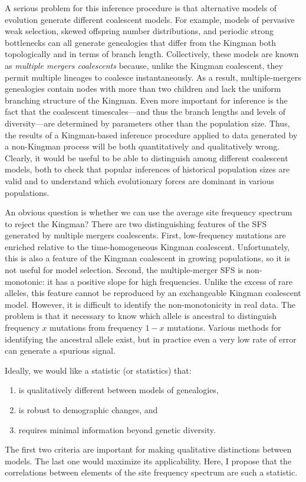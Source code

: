 \documentclass[11pt, letterpaper]{article}   	%
\begin{document}
A serious problem for this inference procedure is that alternative models of evolution generate different coalescent models. For example, models of pervasive weak selection, skewed offspring number distributions, and periodic strong bottlenecks can all generate genealogies that differ from the Kingman both topologically and in terms of branch length.
Collectively, these models are known as \emph{multiple mergers coalescents} because, unlike the Kingman coalescent, they permit multiple lineages to coalesce instantaneously. As a result, multiple-mergers genealogies contain nodes with more than two children and lack the uniform branching structure of the Kingman. Even more important for inference is the fact that the coalescent timescales---and thus the branch lengths and levels of diversity---are determined by parameters other than the population size.
Thus, the results of a Kingman-based inference procedure applied to data generated by a non-Kingman process will be both quantitatively and qualitatively wrong.
Clearly, it would be useful to be able to distinguish among different coalescent models, both to check that popular inferences of historical population sizes are valid and to understand which evolutionary forces are dominant in various populations.

An obvious question is whether we can use the average site frequency spectrum to reject the Kingman? There are two distinguishing features of the SFS generated by multiple mergers coalescents. First, low-frequency mutations are enriched relative to the time-homogeneous Kingman coalescent. Unfortunately, this is also a feature of the Kingman coalescent in growing populations, so it is not useful for model selection. Second, the multiple-merger SFS is non-monotonic: it has a positive slope for high frequencies. Unlike the excess of rare alleles, this feature cannot be reproduced by an exchangeable Kingman coalescent model. However, it is difficult to identify the non-monotonicity in real data. The problem is that it necessary to know which allele is ancestral to distinguish frequency $x$ mutations from frequency $1-x$ mutations. Various methods for identifying the ancestral allele exist, but in practice even a very low rate of error can generate a spurious signal.

Ideally, we would like a statistic (or statistics) that:
\begin{enumerate}
\item is qualitatively different between models of genealogies,
\item is robust to demographic changes, and 
\item requires minimal information beyond genetic diversity.
\end{enumerate}
The first two criteria are important for making qualitative distinctions between models. The last one would maximize its applicability.
Here, I propose that the correlations between elements of the site frequency spectrum are such a statistic.
\end{document}
